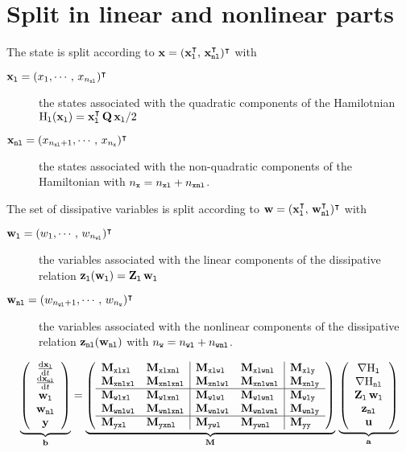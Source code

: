 \documentclass[10pt,a4paper]{article}
\begin{document}
\section{Split in linear and nonlinear parts}
%
%
The state is split according to $\vx=(\vxl^\T, \,\vxnl^\T)^\T $ with 
%
\begin{description}
%
\item[$\vxl = (x_1,\cdots,\,x_\nxl)^\T$] the states associated with the quadratic components of the Hamilotnian $\Hl(\vxl)=\vxl^\T\,\Q\,\vxl/2$
%
\item[$\vxnl=(x_{\nxl+1},\cdots,\,x_\nx)^\T$] the states associated with the non-quadratic components of the Hamiltonian with $\nx = \nxl+\nxnl$.
%
\end{description}
%
%
The set of dissipative variables is split according to $\vw = (\vxl^\T, \, \vwnl^\T)^\T$ with 
%
\begin{description}
%
\item[$\vwl = (w_1,\cdots,\,w_\nwl)^\T$] the variables associated with the linear components of the dissipative relation $\vzl(\vwl)=\mat{Z}_{\lab l}\,\vwl$
%
\item[$\vwnl=(w_{\nwl+1},\cdots,\,w_\nw)^\T$] the variables associated with the nonlinear components of the dissipative relation $\vznl(\vwnl)$ with $\nw = \nwl+\nwnl$.
%
\end{description}
%
\begin{equation}
\underbrace{\left(\begin{array}{c}
\D{\vxl}{t}\\
\D{\vxnl}{t}\\
\vwl\\
\vwnl\\
\vy
\end{array}\right)}_{\vec b}
 = \underbrace{\left(\begin{array}{ll|ll|l}
\M{xlxl}&\M{xlxnl}&\M{xlwl} & \M{xlwnl} & \M{xly}\\ 
\M{xnlxl}&\M{xnlxnl}&\M{xnlwl} &  \M{xnlwnl} & \M{xnly}\\ \hline
\M{wlxl}& \M{wlxnl}& \M{wlwl} & \M{wlwnl} & \M{wly}\\
\M{wnlwl}& \M{wnlxnl}& \M{wnlwl} & \M{wnlwnl} & \M{wnly}\\ \hline
\M{yxl} &\M{yxnl}&\M{ywl} & \M{ywnl} &\M{yy}
\end{array}\right)}_{\M{}}
\,
\underbrace{\left(\begin{array}{c}
\nabla\Hl\\
\nabla\Hnl\\
\mat{Z}_{\lab l}\,\vwl\\
\vznl\\
\vu
\end{array}\right) }_{\vec a}
\end{equation}
%
\end{document}
